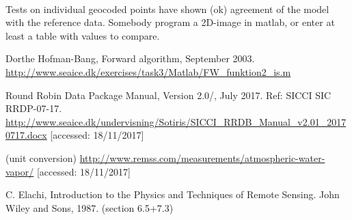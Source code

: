 \documentclass[11pt, a4paper]{article}
\begin{document}


\ \\
Tests on individual geocoded points have shown (ok) agreement of the model with the reference data. Somebody program a 2D-image in matlab, or enter at least a table with values to compare. \newline 




\begin{thebibliography}{99}
	 Dorthe Hofman-Bang, Forward algorithm, September 2003. \newline \url{http://www.seaice.dk/exercises/task3/Matlab/FW_funktion2_is.m} \newline [accessed: 18/11/2017]
	
	
	 Round Robin Data Package Manual, Version 2.0/, July 2017. Ref: SICCI SIC RRDP-07-17. \newline
	\url{http://www.seaice.dk/undervisning/Sotiris/SICCI_RRDB_Manual_v2.01_20170717.docx} [accessed: 18/11/2017]
	
	 (unit conversion) \url{http://www.remss.com/measurements/atmospheric-water-vapor/} [accessed: 18/11/2017]
	
	  C. Elachi, Introduction to the Physics and Techniques of Remote Sensing. John Wiley and Sons, 1987. (section 6.5+7.3)
	
\end{thebibliography}
\end{document}
